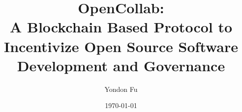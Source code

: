 \documentclass[twocolumn]{article}
\begin{document}
\title{
  {OpenCollab:}\\
  {A Blockchain Based Protocol to Incentivize Open Source Software Development and Governance}
}
\author{Yondon Fu}
\date{\today}

\maketitle







\printbibliography
\end{document}
